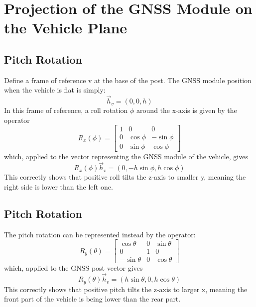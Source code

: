 \documentclass{article}
\begin{document}
\section{Projection of the GNSS Module on the Vehicle Plane}

\subsection{Pitch Rotation}

Define a frame of reference v at the base of the post.
The GNSS module position when the vehicle is flat is simply:
\begin{equation}
\vec{h}_v = (0, 0, h)
\end{equation}
In this frame of reference, a roll rotation $\phi$ around the x-axis is given by the operator
\begin{equation}
  R_x(\phi)=
\begin{bmatrix}
1 & 0 & 0 \\
0 & \cos\phi & -\sin\phi \\
0 & \sin\phi & \cos\phi
\end{bmatrix}
\end{equation}
which, applied to the vector representing the GNSS module of the vehicle, gives
\begin{equation}
R_x(\phi)\vec{h}_v=(0, -h\sin\phi, h\cos\phi)
\end{equation}
This correctly shows that positive roll tilts the z-axis to smaller y, meaning the right side is lower than the left one.

\subsection{Pitch Rotation}

The pitch rotation can be represented instead by the operator:
\begin{equation}
R_y(\theta)=
\begin{bmatrix}
\cos\theta & 0 & \sin\theta \\
0 & 1 & 0 \\
-\sin\theta & 0 & \cos\theta
\end{bmatrix}
\end{equation}
which, applied to the GNSS post vector gives
\begin{equation}
R_y(\theta)\vec{h}_v=(h\sin\theta, 0, h\cos\theta)
\end{equation}
This correctly shows that positive pitch tilts the z-axis to larger x, meaning the front part of the vehicle is being lower
than the rear part.
\end{document}
